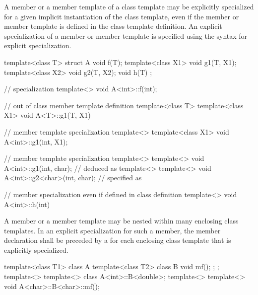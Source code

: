 \pnum
A member or a member template of a class template may be explicitly specialized
for a given implicit instantiation of the class template, even if the member
or member template is defined in the class template definition.
An explicit specialization of a member or member template is specified using the
syntax for explicit specialization.
\begin{example}

\begin{codeblock}
template<class T> struct A {
  void f(T);
  template<class X1> void g1(T, X1);
  template<class X2> void g2(T, X2);
  void h(T) { }
};

// specialization
template<> void A<int>::f(int);

// out of class member template definition
template<class T> template<class X1> void A<T>::g1(T, X1) { }

// member template specialization
template<> template<class X1> void A<int>::g1(int, X1);

// member template specialization
template<> template<>
  void A<int>::g1(int, char);           //  deduced as 
template<> template<>
  void A<int>::g2<char>(int, char);     //  specified as 

// member specialization even if defined in class definition
template<> void A<int>::h(int) { }
\end{codeblock}
\end{example}

\pnum
A member or a member template may be nested within many enclosing class
templates.
In an explicit specialization for such a member,
the member declaration shall be preceded by a
for each enclosing class template that is explicitly specialized.
\begin{example}

\begin{codeblock}
template<class T1> class A {
  template<class T2> class B {
    void mf();
  };
};
template<> template<> class A<int>::B<double>;
template<> template<> void A<char>::B<char>::mf();
\end{codeblock}
\end{example}

